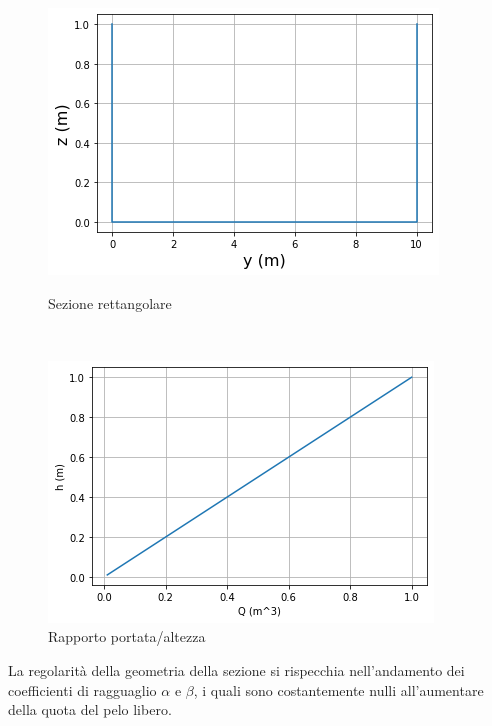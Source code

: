 \documentclass[12pt]{article} %
\begin{document}
\begin{figure}[H]
\begin{minipage}[b]{8.5cm}
\centering
    \includegraphics[width=1 \textwidth]{sezioneret.png}
    \caption{Sezione rettangolare}
    \label{fig:rettangolare_sezione}
\end{minipage}
\ \hspace{2mm} \hspace{3mm} \
\begin{minipage}[b]{8.5cm}
    \centering
    \includegraphics[width=1 \textwidth]{rapporto portata altezzaret.png}
    \caption{Rapporto portata/altezza}
    \label{fig:rettangolare_portata/altezza}
\end{minipage}
\end{figure}

\noindent La regolarità della geometria della sezione si rispecchia nell’andamento dei coefficienti di ragguaglio $\alpha$ e $\beta$, i quali sono costantemente nulli all’aumentare della quota del pelo libero.
\end{document}
